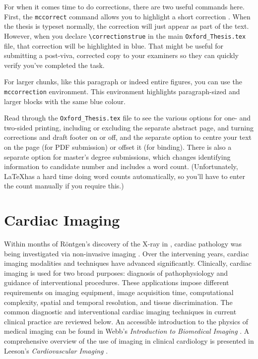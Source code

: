 For when it comes time to do corrections, there are two useful commands here.  First, the \verb|mccorrect| command allows you to highlight a short correction .  When the thesis is typeset normally, the correction will just appear as part of the text.  However, when you declare \verb|\correctionstrue| in the main \verb|Oxford_Thesis.tex| file, that correction will be highlighted in blue.  That might be useful for submitting a post-viva, corrected copy to your examiners so they can quickly verify you've completed the task.

\begin{mccorrection}
    For larger chunks, like this paragraph or indeed entire figures, you can use the \verb|mccorrection| environment.  This environment highlights paragraph-sized and larger blocks with the same blue colour.
\end{mccorrection}

Read through the \verb|Oxford_Thesis.tex| file to see the various options for one- and two-sided printing, including or excluding the separate abstract page, and turning corrections and draft footer on or off, and the separate option to centre your text on the page (for PDF submission) or offset it (for binding).  There is also a separate option for master's degree submissions, which changes identifying information to candidate number and includes a word count.  (Unfortunately, \LaTeX has a hard time doing word counts automatically, so you'll have to enter the count manually if you require this.)

\section{Cardiac Imaging}\label{app:imaging}

Within months of Röntgen's discovery of the X-ray in \cite{gagliardi_rontgen_1996}, cardiac pathology was being investigated via non-invasive imaging \cite{gagliardi_cardiac_1996}.  Over the intervening years, cardiac imaging modalities and techniques have advanced significantly.  Clinically, cardiac imaging is used for two broad purposes: diagnosis of pathophysiology and guidance of interventional procedures.  These applications impose different requirements on imaging equipment, image acquisition time, computational complexity, spatial and temporal resolution, and tissue discrimination.  The common diagnostic and interventional cardiac imaging techniques in current clinical practice are reviewed below.  An accessible introduction to the physics of medical imaging can be found in Webb's \textit{Introduction to Biomedical Imaging} \cite{webb_introduction_2002}.  A comprehensive overview of the use of imaging in clinical cardiology is presented in Leeson's \textit{Cardiovascular Imaging} \cite{leeson_cardiovascular_2011}.

